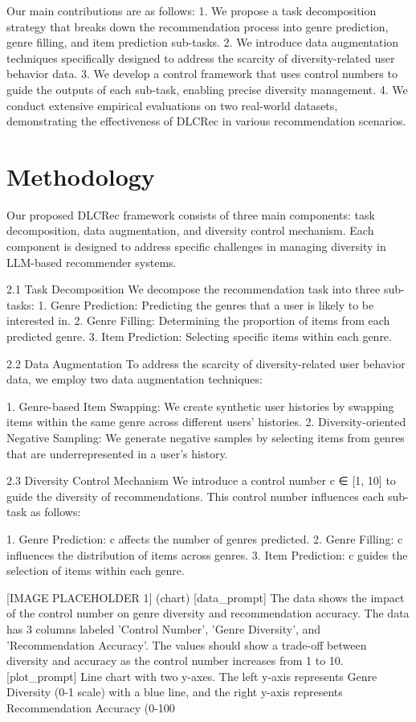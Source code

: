 \documentclass[12pt,letterpaper]{article}
\begin{document}
Our main contributions are as follows:
1. We propose a task decomposition strategy that breaks down the recommendation process into genre prediction, genre filling, and item prediction sub-tasks.
2. We introduce data augmentation techniques specifically designed to address the scarcity of diversity-related user behavior data.
3. We develop a control framework that uses control numbers to guide the outputs of each sub-task, enabling precise diversity management.
4. We conduct extensive empirical evaluations on two real-world datasets, demonstrating the effectiveness of DLCRec in various recommendation scenarios.

\section{Methodology}

Our proposed DLCRec framework consists of three main components: task decomposition, data augmentation, and diversity control mechanism. Each component is designed to address specific challenges in managing diversity in LLM-based recommender systems.

2.1 Task Decomposition
We decompose the recommendation task into three sub-tasks:
1. Genre Prediction: Predicting the genres that a user is likely to be interested in.
2. Genre Filling: Determining the proportion of items from each predicted genre.
3. Item Prediction: Selecting specific items within each genre.

2.2 Data Augmentation
To address the scarcity of diversity-related user behavior data, we employ two data augmentation techniques:

1. Genre-based Item Swapping: We create synthetic user histories by swapping items within the same genre across different users' histories.
2. Diversity-oriented Negative Sampling: We generate negative samples by selecting items from genres that are underrepresented in a user's history.

2.3 Diversity Control Mechanism
We introduce a control number c ∈ [1, 10] to guide the diversity of recommendations. This control number influences each sub-task as follows:

1. Genre Prediction: c affects the number of genres predicted.
2. Genre Filling: c influences the distribution of items across genres.
3. Item Prediction: c guides the selection of items within each genre.

[IMAGE PLACEHOLDER 1] (chart)
[data_prompt] The data shows the impact of the control number on genre diversity and recommendation accuracy. The data has 3 columns labeled 'Control Number', 'Genre Diversity', and 'Recommendation Accuracy'. The values should show a trade-off between diversity and accuracy as the control number increases from 1 to 10.
[plot_prompt] Line chart with two y-axes. The left y-axis represents Genre Diversity (0-1 scale) with a blue line, and the right y-axis represents Recommendation Accuracy (0-100%
\end{document}
